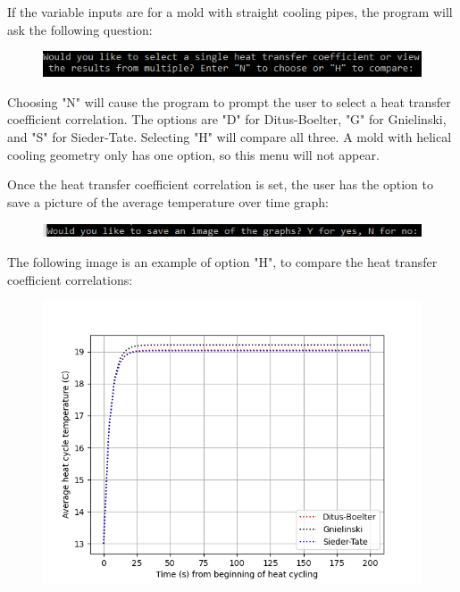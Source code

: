 \documentclass[a4paper,12pt]{article}
\begin{document}
If the variable inputs are for a mold with straight cooling pipes, the program will ask the following question:

\begin{center}
\begin{figure}[h]
\centering
\includegraphics{tutorialimage3.png}
\end{figure}
\end{center}

Choosing "N" will cause the program to prompt the user to select a heat transfer coefficient correlation. The options are "D" for Ditus-Boelter, "G" for Gnielinski, and "S" for Sieder-Tate. Selecting "H" will compare all three. A mold with helical cooling geometry only has one option, so this menu will not appear.

\medskip

Once the heat transfer coefficient correlation is set, the user has the option to save a picture of the average temperature over time graph:

\begin{center}
\begin{figure}[h]
\centering
\includegraphics{tutorialimage4.png}
\end{figure}
\end{center}

\clearpage

The following image is an example of option "H", to compare the heat transfer coefficient correlations:

\begin{center}
\begin{figure}[h]
\centering
\includegraphics{tutorialimage5.png}
\end{figure}
\end{center}
\end{document}
